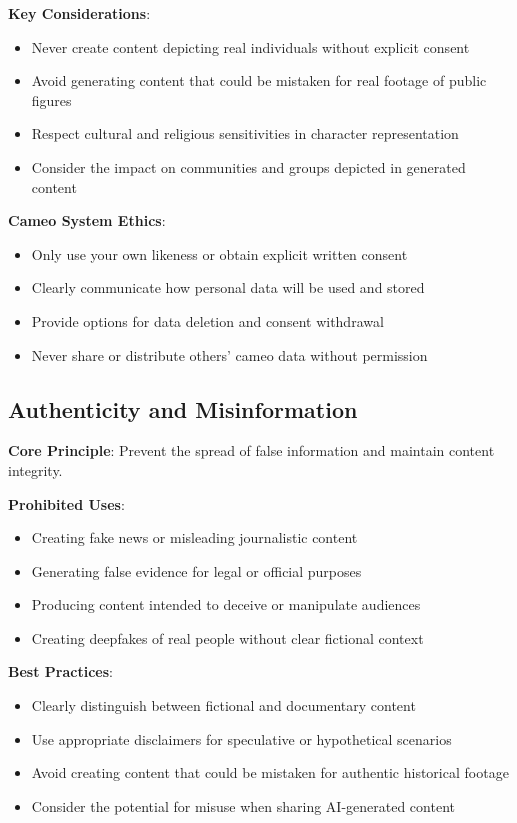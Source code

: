 \textbf{Key Considerations}:
\begin{itemize}
\item Never create content depicting real individuals without explicit consent
\item Avoid generating content that could be mistaken for real footage of public figures
\item Respect cultural and religious sensitivities in character representation
\item Consider the impact on communities and groups depicted in generated content
\end{itemize}

\textbf{Cameo System Ethics}:
\begin{itemize}
\item Only use your own likeness or obtain explicit written consent
\item Clearly communicate how personal data will be used and stored
\item Provide options for data deletion and consent withdrawal
\item Never share or distribute others' cameo data without permission
\end{itemize}

\subsection{Authenticity and Misinformation}
\textbf{Core Principle}: Prevent the spread of false information and maintain content integrity.

\textbf{Prohibited Uses}:
\begin{itemize}
\item Creating fake news or misleading journalistic content
\item Generating false evidence for legal or official purposes
\item Producing content intended to deceive or manipulate audiences
\item Creating deepfakes of real people without clear fictional context
\end{itemize}

\textbf{Best Practices}:
\begin{itemize}
\item Clearly distinguish between fictional and documentary content
\item Use appropriate disclaimers for speculative or hypothetical scenarios
\item Avoid creating content that could be mistaken for authentic historical footage
\item Consider the potential for misuse when sharing AI-generated content
\end{itemize}

